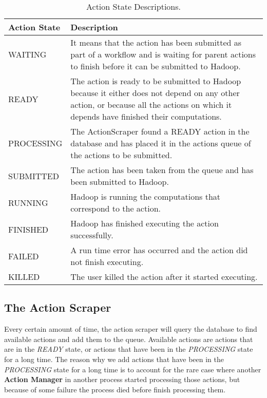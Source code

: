 \begin{table}
\begin{tabular}{| l | p{12cm} |}

\hline
\textbf{Action State} & \textbf{Description} \\ \hline
WAITING & It means that the action has been submitted as part of a workflow and is waiting for parent actions to finish before it can be submitted to Hadoop.\\ \hline
READY & The action is ready to be submitted to Hadoop because it either does not depend on any other action, or because all the actions on which it depends have finished their computations. \\ \hline
PROCESSING & The ActionScraper found a READY action in the database and has placed it in the actions queue of the actions to be submitted. \\ \hline
SUBMITTED & The action has been taken from the queue and has been submitted to Hadoop. \\ \hline
RUNNING & Hadoop is running the computations that correspond to the action. \\ \hline
FINISHED & Hadoop has finished executing the action successfully.\\ \hline
FAILED & A run time error has occurred and the action did not finish executing.\\ \hline
KILLED & The user killed the action after it started executing.\\ \hline
\end{tabular}
\caption{Action State Descriptions.\label{tab:action_states}}
\end{table}

\subsection{The Action Scraper}
Every certain amount of time, the action scraper will query the database to find available actions and add them to the queue. Available actions are actions that are in the \textit{READY} state, or actions that have been in the \textit{PROCESSING} state for a long time. The reason why we add actions that have been in the \textit{PROCESSING} state for a long time is to account for the rare case where another \textbf{Action Manager} in another process started processing those actions, but because of some failure the process died before finish processing them.

